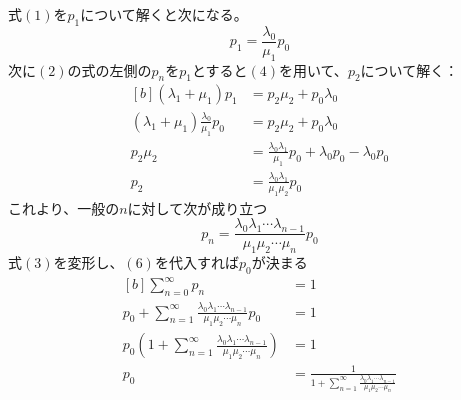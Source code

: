 \documentclass{report}
\begin{document}
\begin{CJK}{UTF8}{min}
    式$(1)$を$p_1$について解くと次になる。
    \begin{equation}
        p_1=\frac{\lambda_0}{\mu_1}p_0
    \end{equation}
    次に$(2)$の式の左側の$p_n$を$p_1$とすると$(4)$を用いて、$p_2$について解く：
    \begin{equation}
        \begin{aligned}[b]
            (\lambda_1+\mu_1)p_1                        & =p_{2}\mu_{2}+p_{0}\lambda_{0}                                 \\
            (\lambda_1+\mu_1)\frac{\lambda_0}{\mu_1}p_0 & =p_{2}\mu_{2}+p_{0}\lambda_{0}                                 \\
            p_{2}\mu_{2}                                & =\frac{\lambda_0\lambda_1}{\mu_1}p_0+\lambda_0p_0-\lambda_0p_0 \\
            p_{2}                                       & =\frac{\lambda_0\lambda_1}{\mu_1\mu_{2}}p_0
        \end{aligned}
    \end{equation}
    これより、一般の$n$に対して次が成り立つ
    \begin{equation}
        p_n=\frac{\lambda_0\lambda_1\cdots\lambda_{n-1}}{\mu_1\mu_2\cdots\mu_n}p_0
    \end{equation}
    式$(3)$を変形し、$(6)$を代入すれば$p_0$が決まる
    \begin{equation}
        \begin{aligned}[b]
            \sum_{n=0}^\infty p_n                                                                                    & =1                                                                                                 \\
            p_0+\sum_{n=1}^\infty \frac{\lambda_0\lambda_1\cdots\lambda_{n-1}}{\mu_1\mu_2\cdots\mu_n}p_0             & =1                                                                                                 \\
            p_0\left( 1+\sum_{n=1}^\infty \frac{\lambda_0\lambda_1\cdots\lambda_{n-1}}{\mu_1\mu_2\cdots\mu_n}\right) & =1                                                                                                 \\
            p_0                                                                                                      & =\frac{1}{1+\sum_{n=1}^\infty \frac{\lambda_0\lambda_1\cdots\lambda_{n-1}}{\mu_1\mu_2\cdots\mu_n}}
        \end{aligned}
    \end{equation}



\end{CJK}
\end{document}
